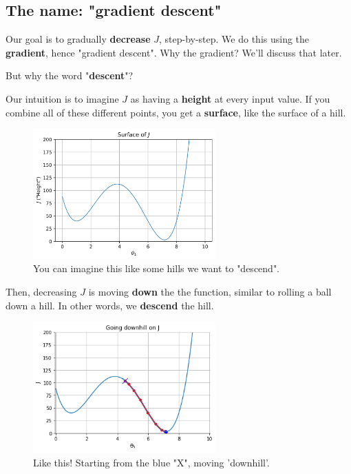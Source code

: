         
    \subsection{The name: "gradient descent"}
    
        Our goal is to gradually \textbf{decrease} $J$, step-by-step. We do this using the \textbf{gradient}, hence "gradient descent". Why the gradient? We'll discuss that later.
        
        But why the word "\textbf{descent}"? 
        
        Our intuition is to imagine $J$ as having a \textbf{height} at every input value. If you combine all of these different points, you get a \textbf{surface}, like the surface of a hill.
        
        \begin{figure}[H]
            \centering
                \includegraphics[width=70mm,scale=0.5]{images/gradient_descent_images/Surface_of_J.png}
            
            \caption*{You can imagine this like some hills we want to "descend".}
        \end{figure}
        
        Then, decreasing $J$ is moving \textbf{down} the the function, similar to rolling a ball down a hill. In other words, we \textbf{descend} the hill.
        
        \begin{figure}[H]
            \centering
                \includegraphics[width=70mm,scale=0.5]{images/gradient_descent_images/going_downhill.png}
            
            \caption*{Like this! Starting from the blue "X", moving 'downhill'.}
        \end{figure}
        
